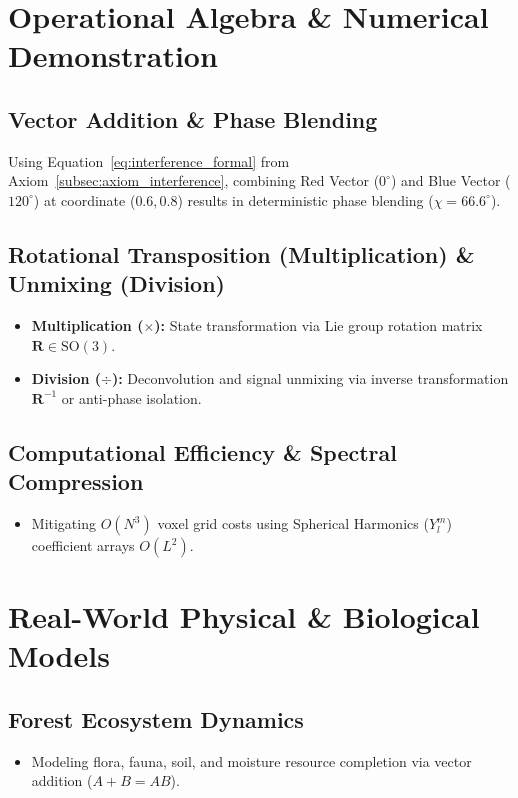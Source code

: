 \documentclass[12pt, a4paper]{article}
\begin{document}
\section{Operational Algebra \& Numerical Demonstration}

\subsection{Vector Addition \& Phase Blending}
Using Equation~\eqref{eq:interference_formal} from Axiom~\ref{subsec:axiom_interference}, combining Red Vector ($0^\circ$) and Blue Vector ($120^\circ$) at coordinate ($0.6, 0.8$) results in deterministic phase blending ($\chi = 66.6^\circ$).

\subsection{Rotational Transposition (Multiplication) \& Unmixing (Division)}
\begin{itemize}
    \item \textbf{Multiplication ($\times$):} State transformation via Lie group rotation matrix $\mathbf{R} \in \mathrm{SO}(3)$.
    \item \textbf{Division ($\div$):} Deconvolution and signal unmixing via inverse transformation $\mathbf{R}^{-1}$ or anti-phase isolation.
\end{itemize}

\subsection{Computational Efficiency \& Spectral Compression}
\begin{itemize}
    \item Mitigating $O(N^3)$ voxel grid costs using Spherical Harmonics ($Y_l^m$) coefficient arrays $O(L^2)$.
\end{itemize}

\section{Real-World Physical \& Biological Models}
\subsection{Forest Ecosystem Dynamics}
\begin{itemize}
    \item Modeling flora, fauna, soil, and moisture resource completion via vector addition ($A + B = AB$).
\end{itemize}
\end{document}
